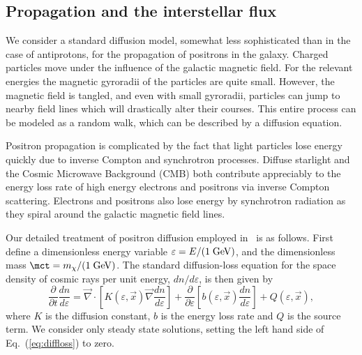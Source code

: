 \subsection{Propagation and the interstellar flux}

We consider a standard diffusion model, somewhat less
sophisticated than in the case of antiprotons, for the propagation of
positrons in the galaxy.  Charged particles move under the influence
of the galactic magnetic field.  For the relevant energies
  the magnetic gyroradii of the particles are quite small.
However, the magnetic field is tangled, and even with small gyroradii,
particles can jump to nearby field lines which will drastically alter
their courses.  This entire process can be modeled as a random walk,
which can be described by a diffusion equation.

Positron propagation is complicated by the fact that light particles lose
energy quickly due to inverse Compton and synchrotron processes.  Diffuse
starlight and the Cosmic Microwave Background (CMB) both contribute appreciably
to the energy loss rate of high energy electrons and positrons via inverse
Compton scattering.  Electrons and positrons also lose energy by synchrotron
radiation as they spiral around the galactic magnetic field lines.

Our detailed treatment of positron diffusion employed in \ds\ is as follows.
First define a dimensionless energy variable $\varepsilon=E/(1\;{\rm GeV})$,
and the dimensionless mass $\mct=m_\chi/(1\;{\rm GeV})$\@.  The
standard diffusion-loss equation for the space density of cosmic rays per unit
energy, $dn/d\varepsilon$, is then given by
\begin{equation}
   \frac{\partial}{\partial t}\frac{dn}{d\varepsilon}=\vec{\nabla}\cdot
   \left[K(\varepsilon,\vec{x})\vec{\nabla}\frac{dn}{d\varepsilon}\right]+
   \frac{\partial}{\partial \varepsilon}\left[b(\varepsilon,\vec{x})
   \frac{dn}{d\varepsilon}\right]+Q(\varepsilon,\vec{x}),
   \label{eq:diffloss}
\end{equation}
where $K$ is the diffusion constant, $b$ is the energy loss rate and $Q$ is the
source term.  We consider only steady state solutions, setting the left hand
side of Eq.\ (\ref{eq:diffloss}) to zero.

